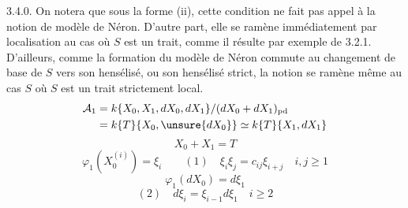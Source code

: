 3.4.0. On notera que sous la forme (ii), cette condition ne fait pas
appel à la notion de modèle de Néron. D'autre part, elle se ramène
immédiatement par localisation au cas où $S$ est un trait, comme il
résulte par exemple de 3.2.1. D'ailleurs, comme la formation du modèle
de Néron commute au changement de base de $S$ vers son hensélisé, ou
son hensélisé strict, la notion se ramène même au cas $S$ où $S$ est
un trait strictement local.
\[
 \begin{aligned}
 \mathcal A_1&=k\{X_0,X_1,dX_0,dX_1\}/(dX_0+dX_1)_{\mathrm{pd}}\\
 &=k\{T\}\{X_0,\unsure{dX_0}\}\simeq k\{T\}\{X_1,dX_1\}
 \end{aligned}
\]
\[
 X_0+X_1=T
\]
\[
 \varphi_1(X_0^{(i)})=\xi_i\qquad
 (1)\quad\boxed{\xi_i\xi_j=c_{ij}\xi_{i+j}}\quad i,j\geq1
\]
\[
 \varphi_1(dX_0)=d\xi_1
\]
\diagram{\[
 \begin{array}{ccc}
 \varphi_1(dX_0^{(i)})&=&d\varphi_1(X_0^{(i)})\\
 \text{''}&&\text{''}\\
 \varphi_1(X_0^{(i-1)}dX_0)&&d\xi_i\\
 \text{''}&&\\
 \xi_{i-1}d\xi_1&&
 \end{array}
\]}
\[
 (2)\quad\boxed{d\xi_i=\xi_{i-1}d\xi_1}\quad i\geq2
\]
